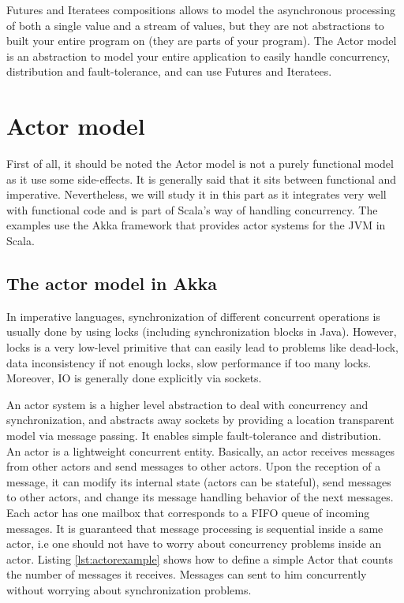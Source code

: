 Futures and Iteratees compositions allows to model the asynchronous processing of both a single value and a stream of values, but 
they are not abstractions to built your entire program on (they are parts of your program).
The Actor model is an abstraction to model your entire application to easily handle concurrency, distribution and fault-tolerance, and can use Futures and Iteratees.

\section{Actor model}

First of all, it should be noted the Actor model is not a purely functional model as it use some side-effects. It is generally said that it sits between functional and
imperative. Nevertheless, we will study it in this part as it integrates very well with functional code and is part of Scala's way of handling concurrency.
The examples use the Akka framework  that provides actor systems for the JVM in Scala.
\\

\subsection{The actor model in Akka}

In imperative languages, synchronization of different concurrent operations is usually done by using locks (including synchronization blocks in Java). 
However, locks is a very low-level primitive that can easily lead to problems like dead-lock, data inconsistency if not enough locks, 
slow performance if too many locks. Moreover, IO is generally done explicitly via sockets.

An actor system is a higher level abstraction to deal with concurrency and synchronization, and abstracts away sockets by providing a location transparent model
via message passing. It enables simple fault-tolerance and distribution.
\\

An actor is a lightweight concurrent entity. Basically, an actor receives messages from other actors and send messages to other actors. Upon the reception of 
a message, it can modify its internal state (actors can be stateful), send messages to other actors, and change its message handling behavior of the next messages.
Each actor has one mailbox that corresponds to a FIFO queue of incoming messages.
It is guaranteed that message processing is sequential inside a same actor, i.e one should not have to worry about concurrency problems inside an actor. Listing
\ref{lst:actorexample} shows how to define a simple Actor that counts the number of messages it receives. Messages can sent to him concurrently without worrying
about synchronization problems.

